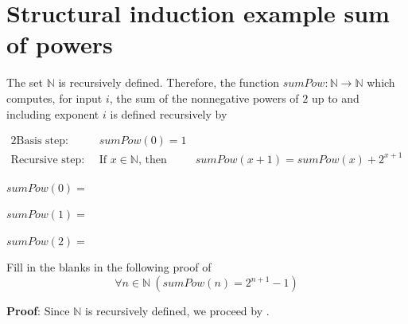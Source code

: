 \documentclass[12pt, oneside]{article}
\begin{document}
 \vfill
\section*{Structural induction example sum of powers}


The set $\mathbb{N}$ is recursively defined.
Therefore, the function $sumPow: \mathbb{N} \to \mathbb{N}$
which computes, for input $i$, the sum of the nonnegative powers of $2$
up to and including exponent $i$ is defined
recursively by

\begin{alignat*}{2}
    \text{Basis step:  } \qquad & sumPow(0) = 1 &\\
    \text{Recursive step:  } & \text{If } x \in \mathbb{N} \text{, then } &sumPow(x+1) = sumPow(x) + 2^{x+1}
\end{alignat*}

$sumPow(0) =$

\vspace{20pt}

$sumPow(1) =$

\vspace{20pt}

$sumPow(2) =$

\vspace{20pt}


Fill in the blanks in the following proof of 
\[
    \forall n \in \mathbb{N}~(sumPow(n) = 2^{n+1} - 1)
\]

{\bf Proof}: Since $\mathbb{N}$ is recursively defined, we proceed by \underline{}.
\end{document}
